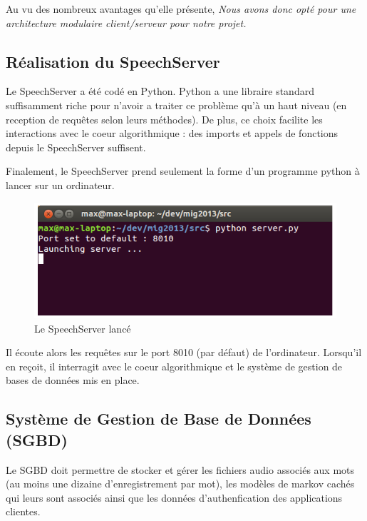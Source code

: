 \documentclass[a4paper,12pt]{report}
\begin{document}
Au vu des nombreux avantages qu'elle présente,
\emph{Nous avons donc opté pour une architecture modulaire client/serveur pour notre projet.}

\subsection{Réalisation du SpeechServer}

Le SpeechServer a été codé en Python. Python a une libraire standard suffisamment riche pour n'avoir a traiter ce problème qu'à un haut niveau (en reception de requêtes selon leurs méthodes). De plus, ce choix facilite les interactions avec le coeur algorithmique : des imports et appels de fonctions depuis le SpeechServer suffisent.

\medskip{}

Finalement, le SpeechServer prend seulement la forme d'un programme python à lancer sur un ordinateur.

\begin{figure}[H]
	\begin{center}
	\includegraphics[width=14cm]{pics/server.png} 
	\end{center}
	\caption{Le SpeechServer lancé}
\end{figure}

Il écoute alors les requêtes sur le port 8010 (par défaut) de l'ordinateur. Lorsqu'il en reçoit, il interragit avec le coeur algorithmique et le système de gestion de bases de données mis en place.

\subsection{Système de Gestion de Base de Données (SGBD)}

Le SGBD doit permettre de stocker et gérer les fichiers audio associés aux mots (au moins une dizaine d'enregistrement par mot), les modèles de markov cachés qui leurs sont associés ainsi que les données d'authenfication des applications clientes.
\end{document}
